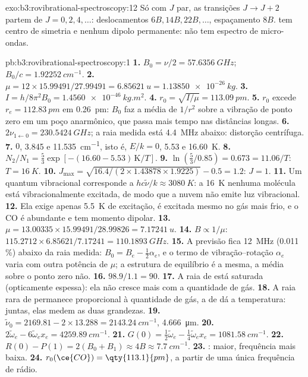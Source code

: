 \begin{solution}{exo:b3:rovibrational-spectroscopy:12}
Só com $J$ par, as transições $J \to J + 2$ partem de $J = 0, 2, 4, \dots$: deslocamentos
$6B, 14B, 22B, \dots$, espaçamento $8B$.  tem centro de simetria e nenhum
dipolo permanente: não tem espectro de micro-ondas.
\end{solution}

\begin{solution}{pb:b3:rovibrational-spectroscopy:1}
\textbf{1.} $B_0 = \nu/2 = \qty{57.6356}{GHz}$; $B_0/c = \qty{1.92252}{cm^{-1}}$.
\textbf{2.} $\mu = 12 \times 15.99491/27.99491 = \qty{6.85621}{u} = \qty{1.13850e-26}{kg}$.
\textbf{3.} $I = h/8\pi^2B_0 = \qty{1.4560e-46}{kg.m^2}$.
\textbf{4.} $r_0 = \sqrt{I/\mu} = \qty{113.09}{pm}$.
\textbf{5.} $r_0$ excede $r_e = \qty{112.83}{pm}$ em \qty{0.26}{pm}: $B_0$ faz a média de $1/r^2$
sobre a vibração de ponto zero em um poço anarmônico, que passa mais tempo
nas distâncias longas.
\textbf{6.} $2\nu_{1\leftarrow0} = \qty{230.5424}{GHz}$; a raia medida está \qty{4.4}{MHz} abaixo:
distorção centrífuga.
\textbf{7.} $0$, 3.845 e \qty{11.535}{cm^{-1}}, isto é, $E/k = 0$, 5.53 e \qty{16.60}{K}.
\textbf{8.} $N_2/N_1 = \frac53\exp[-(16.60 - 5.53)\,\mathrm K/T]$.
\textbf{9.} $\ln(\frac53/0.85) = 0.673 = 11.06/T$: $T = \qty{16}{K}$.
\textbf{10.} $J_{\max} = \sqrt{16.4/(2 \times 1.43878 \times 1.9225)} - 0.5 = 1.2$: $J = 1$.
\textbf{11.} Um quantum vibracional corresponde a $hc\tilde\nu/k \approx \qty{3080}{K}$: a
\qty{16}{K} nenhuma molécula está vibracionalmente excitada, de modo que a nuvem não
emite luz vibracional.
\textbf{12.} Ela exige apenas \qty{5.5}{K} de excitação, é excitada mesmo no gás mais
frio, e o CO é abundante e tem momento dipolar.
\textbf{13.} $\mu = 13.00335 \times 15.99491/28.99826 = \qty{7.17241}{u}$.
\textbf{14.} $B \propto 1/\mu$: $115.2712 \times 6.85621/7.17241 = \qty{110.1893}{GHz}$.
\textbf{15.} A previsão fica \qty{12}{MHz} (0.011\,\%) abaixo da raia medida: $B_0 = B_e - \frac12\alpha_e$, e o
termo de vibração--rotação $\alpha_e$ varia com outra potência de $\mu$; a
estrutura de equilíbrio é a mesma, a média sobre o ponto zero não.
\textbf{16.} $98.9/1.1 = 90$.
\textbf{17.} A raia de  está saturada (opticamente espessa): ela não
cresce mais com a quantidade de gás.
\textbf{18.} A raia rara de  permanece proporcional à quantidade de gás, a de
 dá a temperatura: juntas, elas medem as duas grandezas.
\textbf{19.} $\tilde\nu_0 = 2169.81 - 2 \times 13.288 = \qty{2143.24}{cm^{-1}}$, \qty{4.666}{\micro m}.
\textbf{20.} $2\tilde\omega_e - 6\tilde\omega_ex_e = \qty{4259.89}{cm^{-1}}$.
\textbf{21.} $G(0) = \frac12\tilde\omega_e - \frac14\tilde\omega_ex_e = \qty{1081.58}{cm^{-1}}$.
\textbf{22.} $R(0) - P(1) = 2(B_0 + B_1) \approx 4B \approx \qty{7.7}{cm^{-1}}$.
\textbf{23.} :  maior, frequência mais baixa.
\textbf{24.} \textbf{$r_0(\ce{CO}) = \qty{113.1}{pm}$}, a partir de uma única frequência de rádio.
\end{solution}
